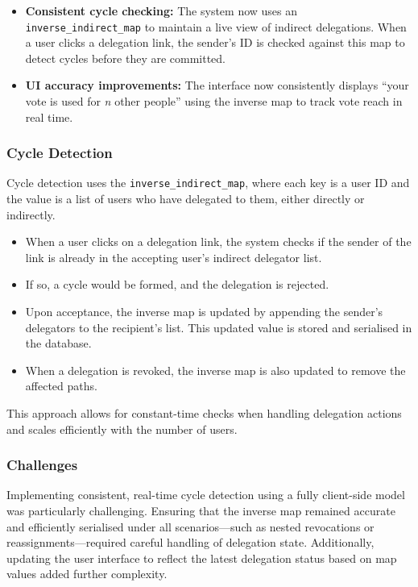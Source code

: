 \begin{itemize}
    \item \textbf{Consistent cycle checking:} The system now uses an \texttt{inverse\_indirect\_map} to maintain a live view of indirect delegations. When a user clicks a delegation link, the sender's ID is checked against this map to detect cycles before they are committed.
    \item \textbf{UI accuracy improvements:} The interface now consistently displays ``your vote is used for \textit{n} other people'' using the inverse map to track vote reach in real time.
\end{itemize}

\subsubsection{Cycle Detection}
Cycle detection uses the \texttt{inverse\_indirect\_map}, where each key is a user ID and the value is a list of users who have delegated to them, either directly or indirectly.

\begin{itemize}
    \item When a user clicks on a delegation link, the system checks if the sender of the link is already in the accepting user's indirect delegator list.
    \item If so, a cycle would be formed, and the delegation is rejected.
    \item Upon acceptance, the inverse map is updated by appending the sender's delegators to the recipient's list. This updated value is stored and serialised in the database.
    \item When a delegation is revoked, the inverse map is also updated to remove the affected paths.
\end{itemize}

This approach allows for constant-time checks when handling delegation actions and scales efficiently with the number of users.

\subsubsection{Challenges}
Implementing consistent, real-time cycle detection using a fully client-side model was particularly challenging. Ensuring that the inverse map remained accurate and efficiently serialised under all scenarios---such as nested revocations or reassignments---required careful handling of delegation state. Additionally, updating the user interface to reflect the latest delegation status based on map values added further complexity.

